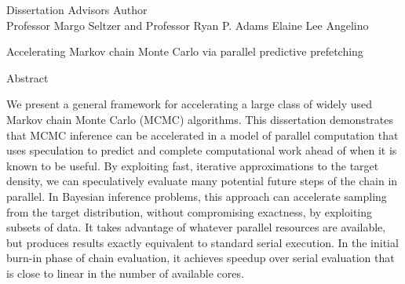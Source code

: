 \newpage

\begin{spacing}{2}
\noi Dissertation Advisors \hfill  Author \\
\noi Professor Margo Seltzer and Professor Ryan P. Adams \hfill Elaine Lee Angelino

\begin{center}
Accelerating Markov chain Monte Carlo via parallel predictive prefetching \\
\end{center}

\begin{center}
Abstract \\
\end{center}

\begin{flushleft}
\hspace{15pt} We present a general framework for accelerating a large class of
widely used Markov chain Monte Carlo (MCMC) algorithms.
This dissertation demonstrates that MCMC inference can be accelerated 
in a model of parallel computation that uses speculation to predict and complete
computational work ahead of when it is known to be useful.
By exploiting fast, iterative approximations to the target density, we can
speculatively evaluate many potential future steps of the chain in parallel.
In Bayesian inference problems, this approach can accelerate sampling from the
target distribution, without compromising exactness, by exploiting subsets of data.
It takes advantage of whatever parallel resources are available, but produces
results exactly equivalent to standard serial execution.
In the initial burn-in phase of chain evaluation, it achieves speedup over
serial evaluation that is close to linear in the number of available cores.
\end{flushleft}

\end{spacing}
